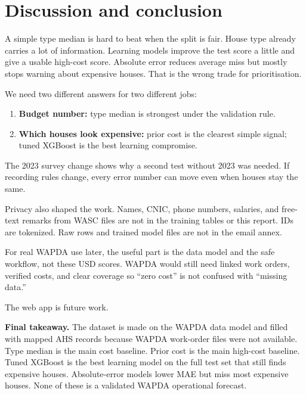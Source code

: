 \documentclass[11pt,a4paper]{article}
\begin{document}
\section{Discussion and conclusion}

A simple type median is hard to beat when the split is fair. House type already carries a lot of information. Learning models improve the test score a little and give a usable high-cost score. Absolute error reduces average miss but mostly stops warning about expensive houses. That is the wrong trade for prioritisation.

We need two different answers for two different jobs:
\begin{enumerate}
  \item \textbf{Budget number:} type median is strongest under the validation rule.
  \item \textbf{Which houses look expensive:} prior cost is the clearest simple signal; tuned XGBoost is the best learning compromise.
\end{enumerate}

The 2023 survey change shows why a second test without 2023 was needed. If recording rules change, every error number can move even when houses stay the same.

Privacy also shaped the work. Names, CNIC, phone numbers, salaries, and free-text remarks from WASC files are not in the training tables or this report. IDs are tokenized. Raw rows and trained model files are not in the email annex.

For real WAPDA use later, the useful part is the data model and the safe workflow, not these USD scores. WAPDA would still need linked work orders, verified costs, and clear coverage so ``zero cost'' is not confused with ``missing data.''

The web app is future work.

\textbf{Final takeaway.} The dataset is made on the WAPDA data model and filled with mapped AHS records because WAPDA work-order files were not available. Type median is the main cost baseline. Prior cost is the main high-cost baseline. Tuned XGBoost is the best learning model on the full test set that still finds expensive houses. Absolute-error models lower MAE but miss most expensive houses. None of these is a validated WAPDA operational forecast.
\end{document}
